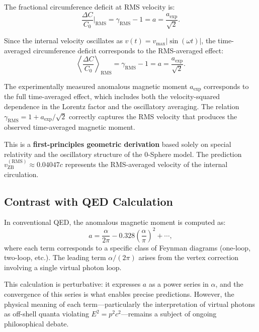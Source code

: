 \documentclass[12pt,letterpaper]{article}
\begin{document}
The fractional circumference deficit at RMS velocity is:
\begin{equation}
\frac{\Delta C}{C_0}\bigg|_{\mathrm{RMS}} = \gamma_{\mathrm{RMS}} - 1 = a = \frac{a_{\mathrm{exp}}}{\sqrt{2}}.
\end{equation}

Since the internal velocity oscillates as $v(t) = v_{\max}|\sin(\omega t)|$, the time-averaged circumference deficit corresponds to the RMS-averaged effect:
\begin{equation}
\left\langle \frac{\Delta C}{C_0} \right\rangle_{\mathrm{RMS}} 
= \gamma_{\mathrm{RMS}} - 1
= a 
= \frac{a_{\mathrm{exp}}}{\sqrt{2}}.
\end{equation}

The experimentally measured anomalous magnetic moment $a_{\mathrm{exp}}$ corresponds to the full time-averaged effect, which includes both the velocity-squared dependence in the Lorentz factor and the oscillatory averaging. The relation $\gamma_{\mathrm{RMS}} = 1 + a_{\mathrm{exp}}/\sqrt{2}$ correctly captures the RMS velocity that produces the observed time-averaged magnetic moment.

This is a \textbf{first-principles geometric derivation} based solely on special relativity and the oscillatory structure of the 0-Sphere model. The prediction $v_{\mathrm{ZB}}^{(\mathrm{RMS})} \approx 0.04047c$ represents the RMS-averaged velocity of the internal circulation.

\subsection{Contrast with QED Calculation}

In conventional QED, the anomalous magnetic moment is computed as:
\begin{equation}
a = \frac{\alpha}{2\pi} - 0.328 \left(\frac{\alpha}{\pi}\right)^2 + \cdots,
\end{equation}
where each term corresponds to a specific class of Feynman diagrams (one-loop, two-loop, etc.). The leading term $\alpha/(2\pi)$ arises from the vertex correction involving a single virtual photon loop.

This calculation is perturbative: it expresses $a$ as a power series in $\alpha$, and the convergence of this series is what enables precise predictions. However, the physical meaning of each term—particularly the interpretation of virtual photons as off-shell quanta violating $E^2 = p^2c^2$—remains a subject of ongoing philosophical debate.
\end{document}
